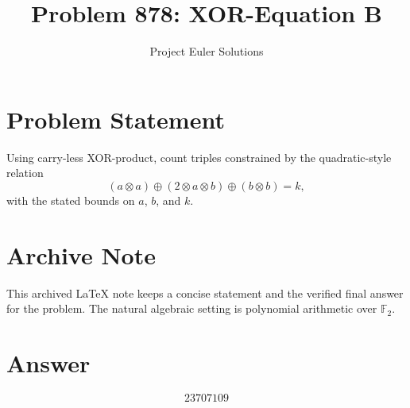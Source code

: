 \documentclass[11pt]{article}
\title{Problem 878: XOR-Equation B}
\author{Project Euler Solutions}
\date{}
\begin{document}
\maketitle

\section{Problem Statement}
Using carry-less XOR-product, count triples constrained by the quadratic-style relation
\[
(a \otimes a) \oplus (2 \otimes a \otimes b) \oplus (b \otimes b) = k,
\]
with the stated bounds on $a$, $b$, and $k$.

\section{Archive Note}
This archived LaTeX note keeps a concise statement and the verified final answer for the problem. The natural algebraic setting is polynomial arithmetic over $\mathbb{F}_2$.

\section{Answer}

\[
\boxed{23707109}
\]
\end{document}
